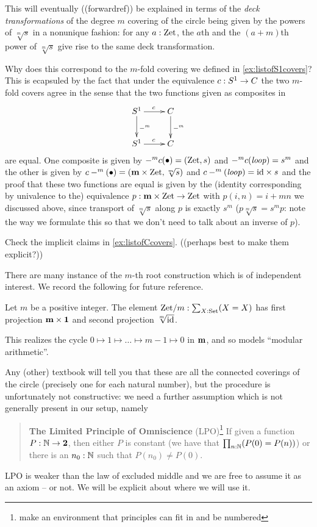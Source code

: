 \begin{example}
This will eventually ((forwardref)) be explained in terms of the \emph{deck transformations} of the degree $m$ covering of the circle being given by the powers of $\sqrt[m]s$ in a nonunique fashion: for any $a:\mathrm{Zet}$, the $a$th and the $(a+m)$th power of $\sqrt[m]s$ give rise to the same deck transformation.


Why does this correspond to the $m$-fold covering we defined in \cref{ex:listofS1covers}?  This is ecapsuled by the fact that under the equivalence $c:S^1\to C$ the two $m$-fold covers agree in the sense that the two functions given as composites in
$$\xymatrix{\Sc\ar[r]^c\ar[d]^{-^m}&C\ar[d]^{-^m}\\\Sc\ar[r]^c&C}$$ are equal.  One composite is given by $-^mc(\bullet)=(\mathrm{Zet},s)$ and $-^mc(\mathit{loop})=s^m$ and the other is given by $c-^m(\bullet)=(\mathbf{m}\times\mathrm{Zet},\sqrt[m]s)$ and $c-^m(\mathit{loop})=\mathord{\mathrm{id}}\times s$ and the proof that these two functions are equal is given by the (identity corresponding by univalence to the) equivalence  $p:\mathbf{m}\times \mathrm{Zet}\to\mathrm{Zet}$ with $p(i,n)=i+mn$ we discussed above, since transport of $\sqrt[m]s$ along $p$ is exactly $s^m$ (\ie $p\sqrt[m]s=s^mp$: note the way we formulate this so that we don't need to talk about an inverse of $p$).
\end{example}
\begin{xca}
  Check the implicit claims in \cref{ex:listofCcovers}.  ((perhaps best to make them explicit?))
\end{xca}
There are many instance of the $m$-th root construction which is of independent interest.  We record the following for future reference.
\begin{definition}
  \label{def:Zetmodm}
  Let $m$ be a positive integer.
  The element $\mathrm{Zet}/m:\sum_{X:\mathord{\mathrm{Set}}}(X=X)$ has first projection $\mathbf{m}\times\mathbf{1}$ and second projection $\sqrt[m]{\mathord{\mathrm{id}}}$.
\end{definition}
This realizes the cycle $0\mapsto1\mapsto\dots\mapsto m-1\mapsto 0$ in $\mathbf{m}$, and so models ``modular arithmetic''.


Any (other) textbook will tell you that these are all the connected coverings of the circle (precisely one for each natural number), but the procedure is unfortunately not constructive: we need a further assumption which is not generally present in our setup, namely

\begin{quote}
  {\bf The Limited Principle of Omniscience} (LPO)\label{LPO}\footnote{make an environment that principles can fit in and be numbered} If given a function $P:\mathbb{N}\to\mathbf{2}$, then either $P$ is constant (we have that $\prod_{n:\mathbb{N}}(P(0)=P(n))$) or there is an $n_0:\mathbb{N}$ such that $P(n_0)\neq P(0)$.
\end{quote}
LPO is weaker than the law of excluded middle and we are free to assume it as an axiom -- or not.  We will be explicit about where we will use it.


